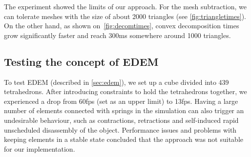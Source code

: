 The experiment showed the limits of our approach. For the mesh subtraction, we can tolerate meshes with the size of about 2000 triangles (see \cref{fig:triangletimes}).  On the other hand, as shown on~\cref{fig:decomtimes}, convex decomposition times grow significantly faster and reach 300ms somewhere around 1000 triangles.


\subsection{Testing the concept of EDEM}
To test EDEM (described in \cref{sec:edem}), we set up a cube divided into 439 tetrahedrons. After introducing constraints to hold the tetrahedrons together, we experienced a drop from 60fps (set as an upper limit) to 13fps. Having a large number of elements connected with springs in the simulation can also trigger an undesirable behaviour, such as contractions, retractions and self-induced rapid unscheduled disassembly of the object. Performance issues and problems with keeping elements in a stable state concluded that the approach was not suitable for our implementation.




